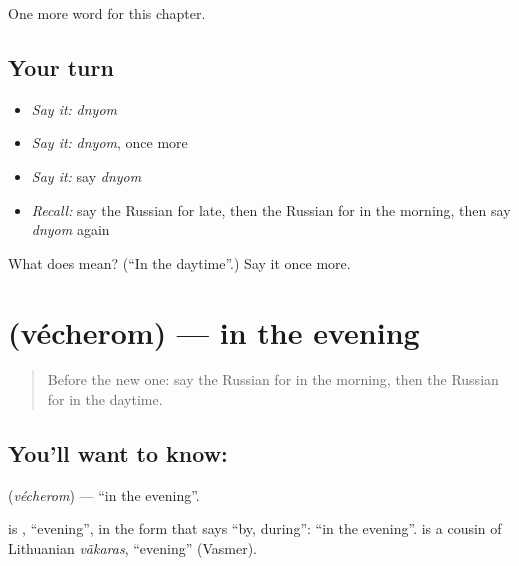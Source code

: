 \begin{grammarlens}[title={What you've built}]
One more word for this chapter.
\end{grammarlens}

\subsection*{Your turn}
\begin{itemize}
\raggedright
  \item \emph{Say it:} \emph{dnyom}
  \item \emph{Say it:} \emph{dnyom}, once more
  \item \emph{Say it:} say \emph{dnyom}
  \item \emph{Recall:} say the Russian for late, then the Russian for in the morning, then say \emph{dnyom} again
\end{itemize}

\begin{tcolorbox}[breakable,colback=teal!4,colframe=teal!35!black,title={Before you move on}]
What does  mean? (\textquotedblleft{}In the daytime\textquotedblright{}.) Say it once more.
\end{tcolorbox}
\section[\texorpdfstring{\ru{вечером} (vécherom)}{вечером (vécherom)}]{ (vécherom) — in the evening}

\label{lesson:RU-C84-in-the-evening}



\begin{quote}
Before the new one: say the Russian for in the morning, then the Russian for in the daytime.
\end{quote}

\subsection*{You'll want to know: }
\textbf{} (\emph{vécherom}) — \textquotedblleft{}in the evening\textquotedblright{}.

\begin{cousinweb}
\textbf{} is \emph{}, \textquotedblleft{}evening\textquotedblright{}, in the form that says \textquotedblleft{}by, during\textquotedblright{}: \textquotedblleft{}in the evening\textquotedblright{}. \emph{} is a cousin of Lithuanian \emph{vãkaras}, \textquotedblleft{}evening\textquotedblright{} (Vasmer).
\end{cousinweb}

